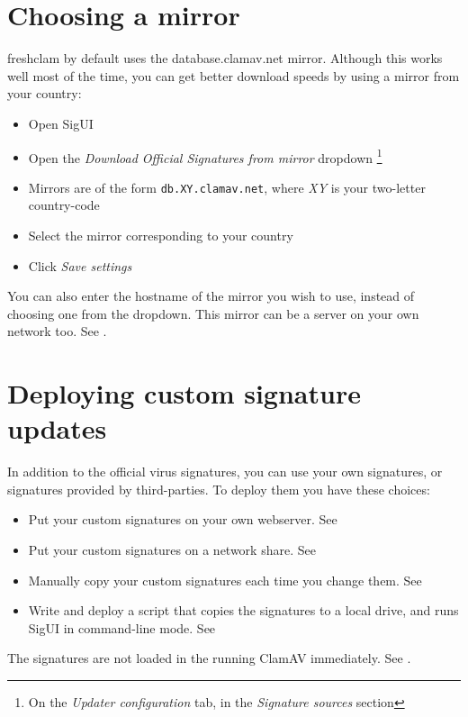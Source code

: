 \section{Choosing a mirror}
\label{sec:mirror}
\Gls{freshclam} by default uses the \gls{database.clamav.net} \gls{mirror}. Although this works well most of the time, you can get better download speeds by using a mirror from your country:
\begin{itemize}
\item Open SigUI
\item Open the \emph{Download Official Signatures from mirror} dropdown \footnote{
On the \emph{Updater configuration} tab, in the \emph{Signature sources} section}
\item Mirrors are of the form \texttt{db.XY.clamav.net}, where \emph{XY} is your two-letter country-code
\item Select the mirror corresponding to your country
\item Click \emph{Save settings}
\end{itemize}

You can also enter the \gls{hostname} of the mirror you wish to use, instead of choosing one from the dropdown. 
This mirror can be a server on your own network too. See .

\section{Deploying custom signature updates}
\label{sec:customsigs}
In addition to the official virus signatures, you can use your own signatures, or signatures provided by third-parties.
To deploy them you have these choices:
\begin{itemize}
 \item Put your custom signatures on your own webserver. See 
 \item Put your custom signatures on a network share. See 
 \item Manually copy your custom signatures each time you change them. See 
 \item Write and deploy a script that copies the signatures to a local drive, and runs SigUI in command-line mode. See 
\end{itemize}

The signatures are not loaded in the running ClamAV immediately. See .

